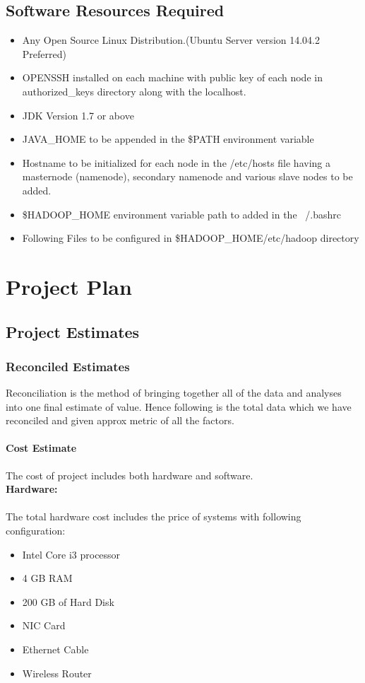 \documentclass[oneside,a4paper,12pt]{report}
\begin{document}
\section{Software Resources Required}
\begin{itemize}
\item Any Open Source Linux Distribution.(Ubuntu Server version 14.04.2 Preferred)
\item OPENSSH installed on each machine with public key of each node in authorized\_keys directory along with the localhost.
\item JDK Version 1.7 or above
\item JAVA\_HOME to be appended in the \$PATH environment variable
\item Hostname to be initialized for each node in the /etc/hosts file having a masternode (namenode), secondary namenode and various slave nodes to be added.
\item \$HADOOP\_HOME environment variable path to added in the ~/.bashrc 
\item Following Files to be configured in \$HADOOP\_HOME/etc/hadoop directory
\end{itemize}




\chapter{Project Plan}

\section{Project Estimates}
             
\subsection{Reconciled Estimates}
Reconciliation is the method of bringing together all of the data and analyses into one final estimate of value. Hence following is the total data which we have reconciled and given approx metric of all the factors. \\

\subsubsection{Cost Estimate}
The cost of project includes both hardware and software. \\[4ex]
\textbf{Hardware:} \\ \\
The total hardware cost includes the price of systems with following configuration: \\
\begin{itemize}
\item Intel Core i3 processor
\item 4 GB RAM
\item 200 GB of Hard Disk
\item NIC Card
\item Ethernet Cable
\item Wireless Router  \\
\end{itemize} 
\end{document}
